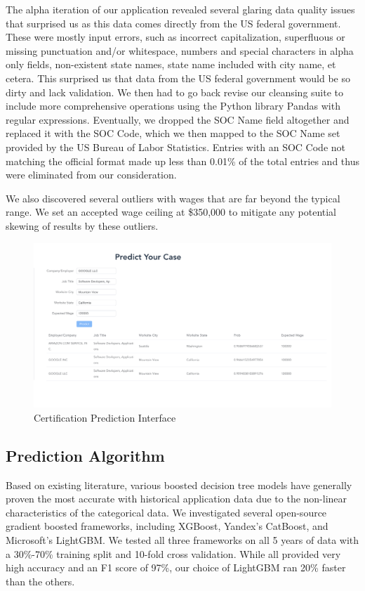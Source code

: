 \documentclass[sigconf]{acmart}
\begin{document}
The alpha iteration of our application revealed several glaring data quality issues that 
surprised us as this data comes directly from the US federal government. 
These were mostly input errors, such as incorrect capitalization, 
superfluous or missing punctuation and/or whitespace, 
numbers and special characters in alpha only fields, 
non-existent state names, state name included with city name, et cetera. 
This surprised us that data from the US federal government would be so dirty and lack validation. 
We then had to go back revise our cleansing suite to include more comprehensive operations using the 
Python library Pandas with regular expressions. 
Eventually, we dropped the SOC Name field altogether and replaced it with the SOC Code, which we 
then mapped to the SOC Name set provided by the US Bureau of Labor Statistics. Entries with 
an SOC Code not matching the official format made up less than 0.01\% of the total entries and thus 
were eliminated from our consideration. 

We also discovered several outliers with wages that are far beyond the typical range. 
We set an accepted wage ceiling at \$350,000 to mitigate any potential skewing of results 
by these outliers. 


\begin{figure}
  \includegraphics[width=\linewidth]{predict.png}
  \caption{Certification Prediction Interface}
  \label{fig:predict}
\end{figure}


\subsection{Prediction Algorithm}
Based on existing literature, various boosted decision tree models have generally proven 
the most accurate with historical application data due to the non-linear characteristics of the 
categorical data. 
We investigated several open-source gradient boosted frameworks, including XGBoost, 
Yandex’s CatBoost, and Microsoft’s LightGBM. We tested all three frameworks on 
all 5 years of data with a 30\%-70\% training split and 10-fold cross validation. 
While all provided very high accuracy and an F1 score of 97\%, our choice of LightGBM ran 20\% faster than the others. 
\end{document}
